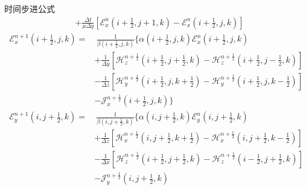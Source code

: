 \begin{theorem}{时间步进公式}
\begin{equation}
\begin{aligned}
            &+\frac{\Delta t}{\mu \Delta y}\left[
                \mathscr{E}_x^n\left(i+\frac{1}{2},j+1,k\right)
                -\mathscr{E}_x^n\left(i+\frac{1}{2},j,k\right)
            \right]
        \end{aligned}
        \label{Yee 三维时间步进公式-3}
    \end{equation}
    \begin{equation}
        \begin{aligned}
            \mathscr{E}_x^{n+1}\left(i+\frac{1}{2},j,k\right)=
            &\ \frac{1}{\beta\left(i+\frac{1}{2},j,k\right)}
            \Bigg\{\alpha\left(i+\frac{1}{2},j,k\right)
            \mathscr{E}_x^n\left(i+\frac{1}{2},j,k\right)\\
            &+\frac{1}{\Delta y}\left[
                \mathscr{H}_z^{n+\frac{1}{2}}\left(i+\frac{1}{2},j+\frac{1}{2},k\right)
                -\mathscr{H}_z^{n+\frac{1}{2}}\left(i+\frac{1}{2},j-\frac{1}{2},k\right)
            \right]\\
            &-\frac{1}{\Delta z}\left[
                \mathscr{H}_y^{n+\frac{1}{2}}\left(i+\frac{1}{2},j,k+\frac{1}{2}\right)
                -\mathscr{H}_y^{n+\frac{1}{2}}\left(i+\frac{1}{2},j,k-\frac{1}{2}\right)
            \right]\\
            &-\mathscr{J}_x^{n+\frac{1}{2}}\left(i+\frac{1}{2},j,k\right)
            \Bigg\}
        \end{aligned}
        \label{Yee 三维时间步进公式-4}
    \end{equation}
    \begin{equation}
        \begin{aligned}
            \mathscr{E}_y^{n+1}\left(i,j+\frac{1}{2},k\right)=
            &\ \frac{1}{\beta\left(i,j+\frac{1}{2},k\right)}
            \Bigg\{\alpha\left(i,j+\frac{1}{2},k\right)
            \mathscr{E}_y^n\left(i,j+\frac{1}{2},k\right)\\
            &+\frac{1}{\Delta z}\left[
                \mathscr{H}_x^{n+\frac{1}{2}}\left(i,j+\frac{1}{2},k+\frac{1}{2}\right)
                -\mathscr{H}_x^{n+\frac{1}{2}}\left(i,j+\frac{1}{2},k-\frac{1}{2}\right)
            \right]\\
            &-\frac{1}{\Delta x}\left[
                \mathscr{H}_z^{n+\frac{1}{2}}\left(i+\frac{1}{2},j+\frac{1}{2},k\right)
                -\mathscr{H}_z^{n+\frac{1}{2}}\left(i-\frac{1}{2},j+\frac{1}{2},k\right)
            \right]\\
            &-\mathscr{J}_y^{n+\frac{1}{2}}\left(i,j+\frac{1}{2},k\right)

\end{aligned}
\end{equation}
\end{theorem}
